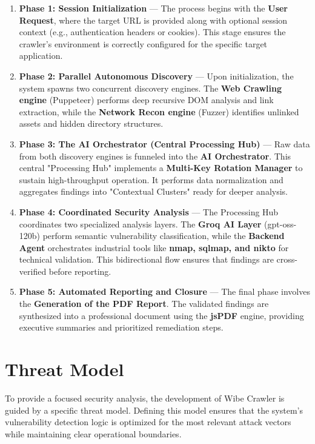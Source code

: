 \documentclass[12pt,oneside,a4paper]{book}
\begin{document}
\begin{enumerate}
    \item \textbf{Phase 1: Session Initialization} --- The process begins with the \textbf{User Request}, where the target URL is provided along with optional session context (e.g., authentication headers or cookies). This stage ensures the crawler’s environment is correctly configured for the specific target application.
    
    \item \textbf{Phase 2: Parallel Autonomous Discovery} --- Upon initialization, the system spawns two concurrent discovery engines. The \textbf{Web Crawling engine} (Puppeteer) performs deep recursive DOM analysis and link extraction, while the \textbf{Network Recon engine} (Fuzzer) identifies unlinked assets and hidden directory structures.
    
    \item \textbf{Phase 3: The AI Orchestrator (Central Processing Hub)} --- Raw data from both discovery engines is funneled into the \textbf{AI Orchestrator}. This central "Processing Hub" implements a \textbf{Multi-Key Rotation Manager} to sustain high-throughput operation. It performs data normalization and aggregates findings into "Contextual Clusters" ready for deeper analysis.
    
    \item \textbf{Phase 4: Coordinated Security Analysis} --- The Processing Hub coordinates two specialized analysis layers. The \textbf{Groq AI Layer} (gpt-oss-120b) perform semantic vulnerability classification, while the \textbf{Backend Agent} orchestrates industrial tools like \textbf{nmap, sqlmap, and nikto} for technical validation. This bidirectional flow ensures that findings are cross-verified before reporting.
    
    \item \textbf{Phase 5: Automated Reporting and Closure} --- The final phase involves the \textbf{Generation of the PDF Report}. The validated findings are synthesized into a professional document using the \textbf{jsPDF} engine, providing executive summaries and prioritized remediation steps.
\end{enumerate}

\section{Threat Model}

To provide a focused security analysis, the development of Wibe Crawler is guided by a specific threat model. Defining this model ensures that the system's vulnerability detection logic is optimized for the most relevant attack vectors while maintaining clear operational boundaries.
\end{document}
